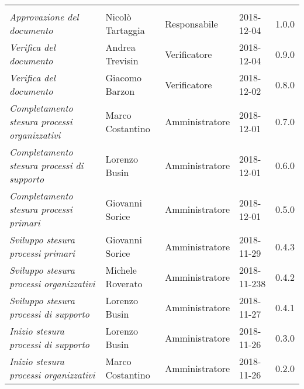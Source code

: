 \newpage 
\section*{}
\begin{table}[H]
	\centering
	\begin{tabular}{p{4cm}|C{3cm}|C{3cm}|R{2.5cm}|R{2cm}}
		
		 & & & & \\
		
		
		\emph{Approvazione del documento} & Nicolò Tartaggia & Responsabile & 2018-12-04 & 1.0.0 \\
		\hline
		
		\emph{Verifica del documento} & Andrea Trevisin & Verificatore & 2018-12-04 & 0.9.0 \\
		\hline
		
		\emph{Verifica del documento} & Giacomo Barzon & Verificatore & 2018-12-02 & 0.8.0 \\
		\hline
		
		\emph{Completamento stesura processi organizzativi} & Marco Costantino & Amministratore & 2018-12-01 & 0.7.0 \\
		\hline
		
		\emph{Completamento stesura processi di supporto} & Lorenzo Busin & Amministratore & 2018-12-01 & 0.6.0 \\
		\hline
		
		\emph{Completamento stesura processi primari} & Giovanni Sorice & Amministratore & 2018-12-01 & 0.5.0 \\
		\hline
		
		\emph{Sviluppo stesura processi primari} & Giovanni Sorice & Amministratore & 2018-11-29 & 0.4.3 \\
		\hline
		
		\emph{Sviluppo stesura processi organizzativi} & Michele Roverato & Amministratore & 2018-11-238 & 0.4.2 \\
		\hline
		
		\emph{Sviluppo stesura processi di supporto} & Lorenzo Busin & Amministratore & 2018-11-27 & 0.4.1 \\
		\hline
		
		\emph{Inizio stesura processi di supporto} & Lorenzo Busin & Amministratore & 2018-11-26 & 0.3.0 \\
		\hline
		
		\emph{Inizio stesura processi organizzativi} & Marco Costantino & Amministratore & 2018-11-26 & 0.2.0 \\
		\hline
		

\end{tabular}
\end{table}
